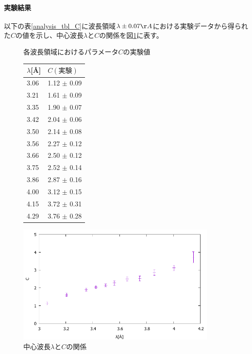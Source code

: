\paragraph{実験結果}
以下の表\ref{analysis_tbl_C}に波長領域$\lambda \pm 0.07 \AA$における実験データから得られた$C$の値を示し、中心波長$\lambda$と$C$の関係を図\ref{analysis_fig_C}に表す。
\begin{figure}[h]
\begin{minipage}{0.35\hsize}
\centering
\makeatletter
\def\@captype{table}
\makeatother
\caption{各波長領域におけるパラメータ$C$の実験値} \label{analysis_tbl_C}
\begin{tabular}{ll}
$\lambda$[\AA] &  $C(実験)$\\ \hline
3.06 	&	1.12 	$\pm$	0.09 \\
3.21 	&	1.61 	$\pm$	0.09 \\
3.35 	&	1.90 	$\pm$	0.07 \\
3.42 	&	2.04 	$\pm$	0.06 \\
3.50 	&	2.14 	$\pm$	0.08 \\
3.56 	&	2.27 	$\pm$	0.12 \\
3.66 	&	2.50 	$\pm$	0.12 \\
3.75 	&	2.52 	$\pm$	0.14 \\
3.86 	&	2.87 	$\pm$	0.16 \\
4.00 	&	3.12 	$\pm$	0.15 \\
4.15 	&	3.72 	$\pm$	0.31 \\
4.29 	&	3.76 	$\pm$	0.28 \\ \hline
\end{tabular}
\end{minipage}
\begin{minipage}{0.65\hsize}
\centering
\vspace{2.5cm}
\includegraphics[width=10cm]{analysis/C/C_F.pdf}
\caption{中心波長$\lambda$と$C$の関係} \label{analysis_fig_C}
\end{minipage}
\end{figure}

